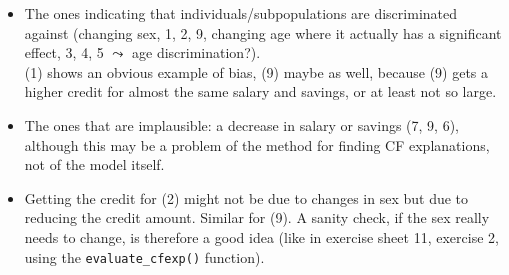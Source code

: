 {\begin{enumerate}[a)]
  \begin{itemize}
      \item The ones indicating that individuals/subpopulations are discriminated against (changing sex, 1, 2, 9, changing age where it actually has a significant effect, 3, 4, 5 $\leadsto$ age discrimination?). \\
      (1) shows an obvious example of bias, (9) maybe as well, because (9) gets a higher credit for almost the same salary and savings, or at least not so large.
      \item The ones that are implausible: a decrease in salary or savings (7, 9, 6), although this may be a problem of the method for finding CF explanations, not of the model itself.
      \item Getting the credit for (2) might not be due to changes in sex but due to reducing the credit amount. Similar for (9).
            A sanity check, if the sex really needs to change, is therefore a good idea (like in exercise sheet 11, exercise 2, using the \texttt{evaluate\_cfexp()} function).
  \end{itemize}
  
\end{enumerate}
}
